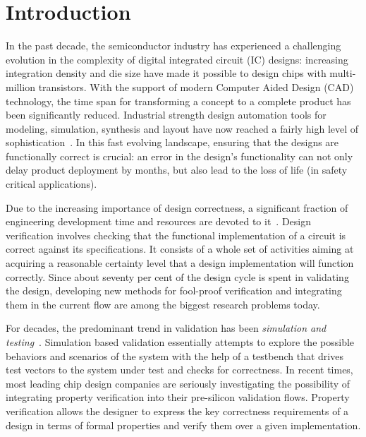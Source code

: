 \documentclass[a4paper, 11pt]{article}
\begin{document}
\section{Introduction} \label{sec1}
\noindent
In the past decade, the semiconductor industry has experienced a challenging 
evolution in the complexity of digital integrated circuit (IC) designs: 
increasing integration density and die size have made it possible to 
design chips with multi-million transistors. With the support of modern 
Computer Aided Design (CAD) technology, the time span
for transforming a concept to a complete product has been significantly
reduced. Industrial strength design automation tools for modeling, simulation,
synthesis and layout have now reached a fairly high level of
sophistication~\cite{synopsys_beh,dc,synopsys,vcs}. 
In this fast evolving landscape, ensuring that the designs are functionally 
correct is crucial: an error in the design's functionality can not only 
delay product deployment by months, but also lead to the loss of life (in 
safety critical applications).

Due to the increasing importance of design correctness, a significant 
fraction of 
engineering development time and resources are devoted to it~\cite{cav}. 
Design verification involves checking that the functional implementation of a 
circuit is correct against its specifications. It consists of a whole 
set of activities aiming at acquiring a reasonable certainty level that 
a design implementation will function correctly. 
Since about seventy per cent of the design cycle is spent
in validating the design, developing new methods for fool-proof verification
and integrating them in the current flow are among the biggest research
problems today.

For decades, the predominant trend in validation has been
{\em simulation and testing}~\cite{soc}. Simulation based validation 
essentially attempts to explore the possible behaviors and scenarios of the 
system with the help of a testbench that drives test vectors to the
system under test and checks for correctness. In recent times, most leading 
chip design companies are seriously investigating the possibility of 
integrating property verification into their pre-silicon validation flows. 
Property verification allows the designer to express the key
correctness requirements of a design in terms of formal properties and
verify them over a given implementation. 
\end{document}
